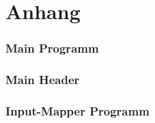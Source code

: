 \chapter{Anhang}
\subsection{Main Programm}
%
\newpage
\subsection{Main Header}
%
\newpage
\subsection{Input-Mapper Programm}
%